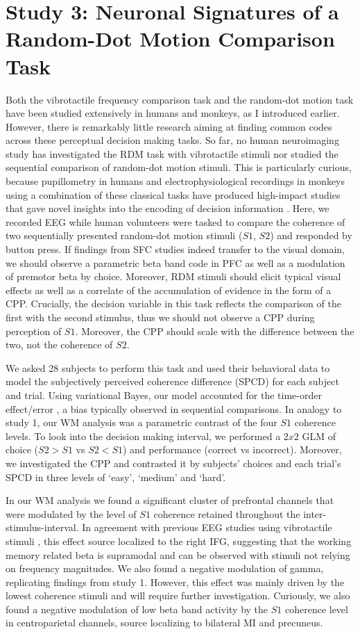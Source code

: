 \section{Study 3: Neuronal Signatures of a Random-Dot Motion Comparison Task}
Both the vibrotactile frequency comparison task and the random-dot motion task have been studied extensively in humans and monkeys, as I introduced earlier. However, there is remarkably little research aiming at finding common codes across these perceptual decision making tasks. So far, no human neuroimaging study has investigated the RDM task with vibrotactile stimuli nor studied the sequential comparison of random-dot motion stimuli. This is particularly curious, because pupillometry in humans and electrophysiological recordings in monkeys using a combination of these classical tasks have produced high-impact studies that gave novel insights into the encoding of decision information \parencite{Urai2017,Wimmer2016}. Here, we recorded EEG while human volunteers were tasked to compare the coherence of two sequentially presented random-dot motion stimuli ($S1$, $S2$) and responded by button press. If findings from SFC studies indeed transfer to the visual domain, we should observe a parametric beta band code in PFC as well as a modulation of premotor beta by choice. Moreover, RDM stimuli should elicit typical visual effects as well as a correlate of the accumulation of evidence in the form of a CPP. Crucially, the decision variable in this task reflects the comparison of the first with the second stimulus, thus we should not observe a CPP during perception of $S1$. Moreover, the CPP should scale with the difference between the two, not the coherence of $S2$.

We asked 28 subjects to perform this task and used their behavioral data to model the subjectively perceived coherence difference (SPCD) for each subject and trial. Using variational Bayes, our model accounted for the time-order effect/error \parencite{Hellstrom1985}, a bias typically observed in sequential comparisons. In analogy to study 1, our WM analysis was a parametric contrast of the four $S1$ coherence levels. To look into the decision making interval, we performed a $2x2$ GLM of choice ($S2>S1$ vs $S2<S1$) and performance (correct vs incorrect). Moreover, we investigated the CPP and contrasted it by subjects’ choices and each trial’s SPCD in three levels of ‘easy’, ‘medium’ and ‘hard’.

In our WM analysis we found a significant cluster of prefrontal channels that were modulated by the level of $S1$ coherence retained throughout the inter-stimulus-interval. In agreement with previous EEG studies using vibrotactile stimuli \parencite{Spitzer2010,Spitzer2012}, this effect source localized to the right IFG, suggesting that the working memory related beta is supramodal and can be observed with stimuli not relying on frequency magnitudes. We also found a negative modulation of gamma, replicating findings from study 1. However, this effect was mainly driven by the lowest coherence stimuli and will require further investigation. Curiously, we also found a negative modulation of low beta band activity by the $S1$ coherence level in centroparietal channels, source localizing to bilateral MI and precuneus.

